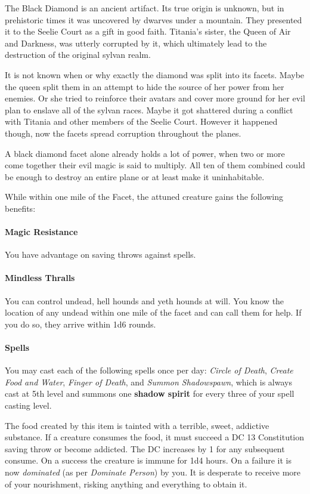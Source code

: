 \documentclass[letter,10pt,twocolumn,openany]{dndbook}
\begin{document}
The Black Diamond is an ancient artifact.
Its true origin is unknown, but in prehistoric times it was uncovered by dwarves under a mountain.
They presented it to the Seelie Court as a gift in good faith.
Titania's sister, the Queen of Air and Darkness, was utterly corrupted by it,
which ultimately lead to the destruction of the original sylvan realm.

It is not known when or why exactly the diamond was split into its facets.
Maybe the queen split them in an attempt to hide the source of her power from her enemies.
Or she tried to reinforce their avatars and cover more ground for her evil plan to enslave all of the sylvan races.
Maybe it got shattered during a conflict with Titania and other members of the Seelie Court.
However it happened though, now the facets spread corruption throughout the planes.

A black diamond facet alone already holds a lot of power,
when two or more come together their evil magic is said to multiply.
All ten of them combined could be enough to destroy an entire plane or at least make it uninhabitable.

While within one mile of the Facet, the attuned creature gains the following benefits:

\paragraph{Magic Resistance}
You have advantage on saving throws against spells.

\paragraph{Mindless Thralls}
You can control undead, hell hounds and yeth hounds at will.
You know the location of any undead within one mile of the facet and can call them for help.
If you do so, they arrive within 1d6 rounds.

\paragraph{Spells}
You may cast each of the following spells once per day:
\textit{Circle of Death}, \textit{Create Food and Water}, \textit{Finger of Death}, and \textit{Summon Shadowspawn},
which is always cast at 5th level and summons one \textbf{shadow spirit} for every three of your spell casting level.

The food created by this item is tainted with a terrible, sweet, addictive substance.
If a creature consumes the food, it must succeed a DC 13 Constitution saving throw or become addicted.
The DC increases by 1 for any subsequent consume.
On a success the creature is immune for 1d4 hours.
On a failure it is now \textit{dominated} (as per \textit{Dominate Person}) by you.
It is desperate to receive more of your nourishment, risking anything and everything to obtain it.
\end{document}
